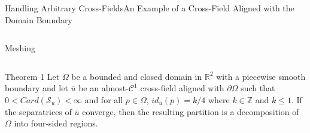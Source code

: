 \documentclass[compress,10pt,aspectratio=169]{beamer}
\begin{document}
\begin{frame}{Handling Arbitrary Cross-Fields}{An Example of a Cross-Field Aligned with the Domain Boundary}
\begin{columns}
\begin{column}{0.33\textwidth}
        \footnotesize Meshing
        \end{column}
    \end{columns}
    \vspace{0.4cm}
        \begin{onerablock}{\small Theorem 1}
    \small
Let $\Omega$ be a bounded and closed domain in $\mathbb{R}^2$ with a piecewise smooth boundary and let $\bar{u}$ be an almost-$\mathcal{C}^1$ cross-field aligned with $\partial\Omega$ such that $0<Card(\mathcal{S}_{\bar{u}})<\infty$ and for all $p\in\Omega$, $id_{\bar{u}}(p)=k/4$ where $k\in\mathbb{Z}$ and $k\leq 1$. If the separatrices of $\bar{u}$ converge, then the resulting partition is a decomposition of $\Omega$ into four-sided regions.
    \end{onerablock}
\end{frame}
\end{document}

